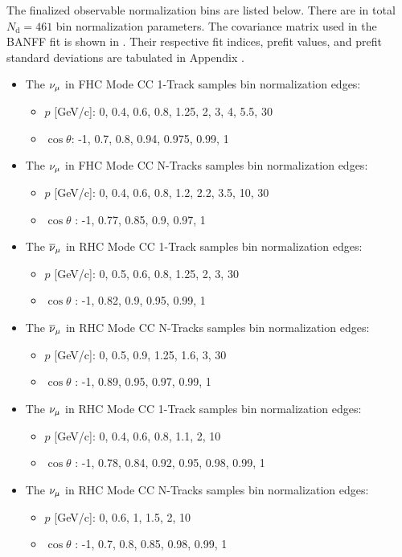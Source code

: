 The finalized observable normalization bins are listed below. There
are in total $N_{\text{d}}=461$ bin normalization parameters. The
covariance matrix used in the BANFF fit is shown in .
Their respective fit indices, prefit values, and prefit standard deviations
are tabulated in Appendix .
\begin{itemize}
\item The $\nu_{\mu}$ in FHC Mode CC 1-Track samples bin normalization edges:
\begin{itemize}
\item $p$ {[}GeV/c{]}: 0, 0.4, 0.6, 0.8, 1.25, 2, 3, 4, 5.5, 30
\item $\cos\theta$: -1, 0.7, 0.8, 0.94, 0.975, 0.99, 1
\end{itemize}
\item The $\nu_{\mu}$ in FHC Mode CC N-Tracks samples bin normalization edges:
\begin{itemize}
\item $p$ {[}GeV/c{]}: 0, 0.4, 0.6, 0.8, 1.2, 2.2, 3.5, 10, 30
\item $\cos\theta$ : -1, 0.77, 0.85, 0.9, 0.97, 1
\end{itemize}
\item The $\overline{\nu}_{\mu}$ in RHC Mode CC 1-Track samples bin normalization edges:
\begin{itemize}
\item $p$ {[}GeV/c{]}: 0, 0.5, 0.6, 0.8, 1.25, 2, 3, 30
\item $\cos\theta$ : -1, 0.82, 0.9, 0.95, 0.99, 1
\end{itemize}
\item The $\overline{\nu}_{\mu}$ in RHC Mode CC N-Tracks samples bin normalization
edges:
\begin{itemize}
\item $p$ {[}GeV/c{]}: 0, 0.5, 0.9, 1.25, 1.6, 3, 30
\item $\cos\theta$ : -1, 0.89, 0.95, 0.97, 0.99, 1
\end{itemize}
\item The $\nu_{\mu}$ in RHC Mode CC 1-Track samples bin normalization edges:
\begin{itemize}
\item $p$ {[}GeV/c{]}: 0, 0.4, 0.6, 0.8, 1.1, 2, 10
\item $\cos\theta$ : -1, 0.78, 0.84, 0.92, 0.95, 0.98, 0.99, 1
\end{itemize}
\item The $\nu_{\mu}$ in RHC Mode CC N-Tracks samples bin normalization edges:
\begin{itemize}
\item $p$ {[}GeV/c{]}: 0, 0.6, 1, 1.5, 2, 10
\item $\cos\theta$ : -1, 0.7, 0.8, 0.85, 0.98, 0.99, 1
\end{itemize}
\end{itemize}
